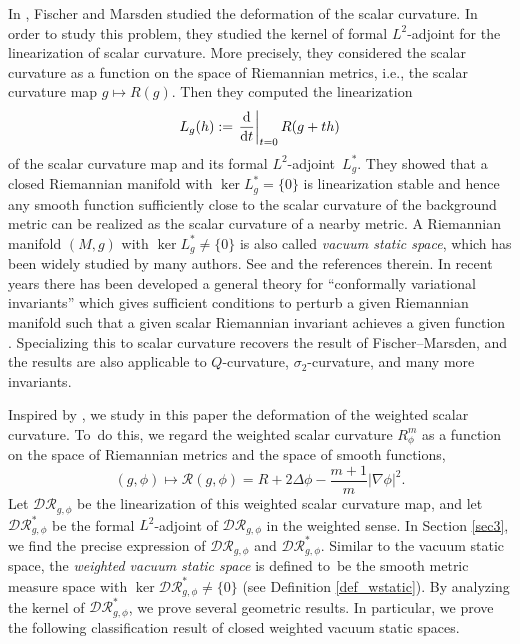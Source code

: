 \documentclass[10pt,a4paper]{amsart}
\numberwithin{equation}{section}
\begin{document}
In \cite{Fischer&Marsden}, Fischer and Marsden studied
the deformation of the scalar curvature. In order to study this problem, they studied the kernel of formal $L^2$-adjoint for the linearization of scalar curvature. More precisely, they considered the scalar curvature as a function on the space of Riemannian metrics, i.e.,
the scalar curvature map $g\mapsto R(g)$.
Then they computed the linearization
\[L_g(h):= \left.\frac{{\rm d}}{{\rm d}t}\right|_{t=0}R(g+th)\]
of the scalar curvature map and its formal $L^2$-adjoint~$L_g^*$. They showed that a closed Riemannian manifold with $\ker L_g^*= \{0\}$ is linearization stable and hence any smooth function sufficiently close to the scalar curvature of the background metric can be realized as the scalar curvature of a nearby metric.
A Riemannian manifold $(M,g)$ with $\ker L_g^*\neq \{0\}$ is also called \textit{vacuum static space}, which has been widely studied by many authors. See \cite{Corvino1,Corvino&Eichmair&Miao, Corvino&Schoen, Kobayashi, Qing&Yuan1, Qing&Yuan2} and the references therein.
In recent years there has been developed a general theory for ``conformally variational invariants''
which gives sufficient conditions to perturb a given Riemannian manifold such that a given scalar
Riemannian invariant achieves a given function \cite{Case&Lin&Yuan1,Case&Lin&Yuan2}.
Specializing this to scalar curvature recovers the result of Fischer--Marsden, and the results are
also applicable to $Q$-curvature, $\sigma_2$-curvature, and many more invariants.

Inspired by \cite{Fischer&Marsden}, we study in this paper the deformation of the weighted scalar curvature.
To~do this, we regard the weighted scalar curvature $R_\phi^m$ as a
function on the space of Riemannian metrics and the space of smooth functions,
\begin{equation*}
 (g,\phi)\mapsto \mathcal{R}(g,\phi)=R+2\Delta \phi -\frac{m+1}{m}|\nabla \phi|^2.
\end{equation*}
Let $\mathcal{DR}_{g,\phi}$ be the linearization of this weighted scalar curvature map, and let $\mathcal{DR}_{g,\phi}^*$ be the formal $L^2$-adjoint of $\mathcal{DR}_{g,\phi}$ in the weighted sense.
In Section \ref{sec3}, we find the precise expression of $\mathcal{DR}_{g,\phi}$ and $\mathcal{DR}^*_{g,\phi}$.
Similar to the vacuum static space, the \textit{weighted vacuum static space}
is defined to~be the smooth metric measure space with $\ker \mathcal{DR}_{g,\phi}^*\neq \{0\}$ (see Definition \ref{def_wstatic}).
By analyzing the kernel of $\mathcal{DR}_{g,\phi}^*$, we prove several geometric results.
In particular, we prove the following classification result of closed weighted vacuum static spaces.
\end{document}
